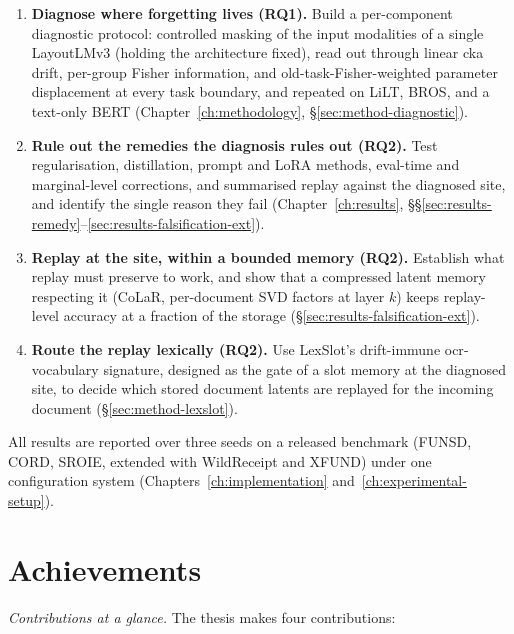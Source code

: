 \begin{enumerate}
  \item \textbf{Diagnose where forgetting lives (RQ1).} Build a per-component diagnostic
        protocol: controlled masking of the input modalities of a single LayoutLMv3 (holding
        the architecture fixed), read out through linear \gls{cka} drift, per-group Fisher
        information, and old-task-Fisher-weighted parameter displacement at every task
        boundary, and repeated on LiLT, BROS, and a text-only BERT
        (Chapter~\ref{ch:methodology}, \S\ref{sec:method-diagnostic}).
  \item \textbf{Rule out the remedies the diagnosis rules out (RQ2).} Test regularisation,
        distillation, prompt and LoRA methods, eval-time and marginal-level corrections, and
        summarised replay against the diagnosed site, and identify the single reason they fail
        (Chapter~\ref{ch:results}, \S\S\ref{sec:results-remedy}--\ref{sec:results-falsification-ext}).
  \item \textbf{Replay at the site, within a bounded memory (RQ2).} Establish what replay must
        preserve to work, and show that a compressed latent memory respecting it (CoLaR,
        per-document SVD factors at layer $k$) keeps replay-level accuracy at a fraction of the
        storage (\S\ref{sec:results-falsification-ext}).
  \item \textbf{Route the replay lexically (RQ2).} Use LexSlot's drift-immune
        \gls{ocr}-vocabulary signature, designed as the gate of a slot memory at the diagnosed
        site, to decide which stored document latents are replayed for the incoming document
        (\S\ref{sec:method-lexslot}).
\end{enumerate}
\noindent All results are reported over three seeds on a released benchmark (FUNSD, CORD,
SROIE, extended with WildReceipt and XFUND) under one configuration system
(Chapters~\ref{ch:implementation} and~\ref{ch:experimental-setup}).

\section{Achievements}
\label{sec:intro-achievements}

\noindent\emph{Contributions at a glance.} The thesis makes four contributions:

